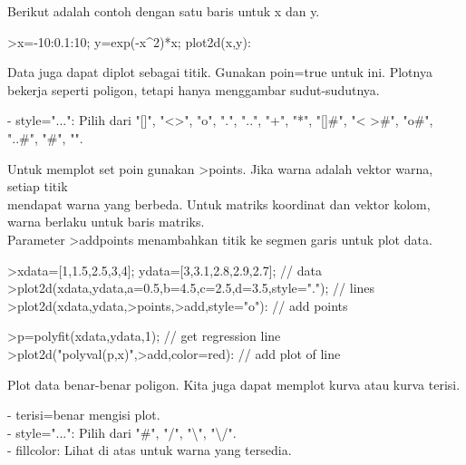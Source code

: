 \documentclass[a4paper,10pt]{article}
\begin{document}
\begin{eulernotebook}
\begin{eulercomment}
\begin{eulercomment}
\begin{eulercomment}
\begin{eulercomment}
\begin{eulercomment}
\begin{eulercomment}
\begin{eulercomment}
\begin{eulercomment}
\begin{eulercomment}
Berikut adalah contoh dengan satu baris untuk x dan y.
\end{eulercomment}
\begin{eulerprompt}
>x=-10:0.1:10; y=exp(-x^2)*x; plot2d(x,y):
\end{eulerprompt}
\begin{eulercomment}
Data juga dapat diplot sebagai titik. Gunakan poin=true untuk ini.
Plotnya bekerja seperti poligon, tetapi hanya menggambar
sudut-sudutnya.

- style="...": Pilih dari "[]", "\textless{}\textgreater{}", "o", ".", "..", "+", "*", "[]#",
"\textless{} \textgreater{}#", "o#", "..#", "#", "\textbar{}".

Untuk memplot set poin gunakan \textgreater{}points. Jika warna adalah vektor
warna, setiap titik\\
mendapat warna yang berbeda. Untuk matriks koordinat dan vektor kolom,
warna berlaku untuk baris matriks.\\
Parameter \textgreater{}addpoints menambahkan titik ke segmen garis untuk plot
data.
\end{eulercomment}
\begin{eulerprompt}
>xdata=[1,1.5,2.5,3,4]; ydata=[3,3.1,2.8,2.9,2.7]; // data
>plot2d(xdata,ydata,a=0.5,b=4.5,c=2.5,d=3.5,style="."); // lines
>plot2d(xdata,ydata,>points,>add,style="o"): // add points
\end{eulerprompt}
\begin{eulerprompt}
>p=polyfit(xdata,ydata,1); // get regression line
>plot2d("polyval(p,x)",>add,color=red): // add plot of line
\end{eulerprompt}
\begin{eulercomment}
Plot data benar-benar poligon. Kita juga dapat memplot kurva atau
kurva terisi.

- terisi=benar mengisi plot.\\
- style="...": Pilih dari "#", "/", "\textbackslash{}", "\textbackslash{}/".\\
- fillcolor: Lihat di atas untuk warna yang tersedia.


\end{eulercomment}
\end{eulercomment}
\end{eulercomment}
\end{eulercomment}
\end{eulercomment}
\end{eulercomment}
\end{eulercomment}
\end{eulercomment}
\end{eulercomment}
\end{eulernotebook}
\end{document}
